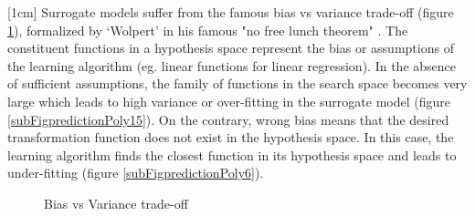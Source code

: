 [1cm]
Surrogate models suffer from the famous bias vs variance trade-off (figure \ref{figBiasVsVariance}), formalized by `Wolpert' in his famous "no free lunch theorem" \cite{wolpert1997no}. The constituent functions in a hypothesis space represent the bias or assumptions of the learning algorithm (eg. linear functions for linear regression). In the absence of sufficient assumptions, the family of functions in the search space becomes very large which leads to high variance or over-fitting in the surrogate model (figure \ref{subFigpredictionPoly15}). On the contrary, wrong bias means that the desired transformation function does not exist in the hypothesis space. In this case, the learning algorithm finds the closest function in its hypothesis space and leads to under-fitting (figure \ref{subFigpredictionPoly6}).

\begin{figure}[!ht]
  \centering
    \quad
{}\quad
  \quad
       \caption{Bias vs Variance trade-off}
       \label{figBiasVsVariance}
\end{figure}



